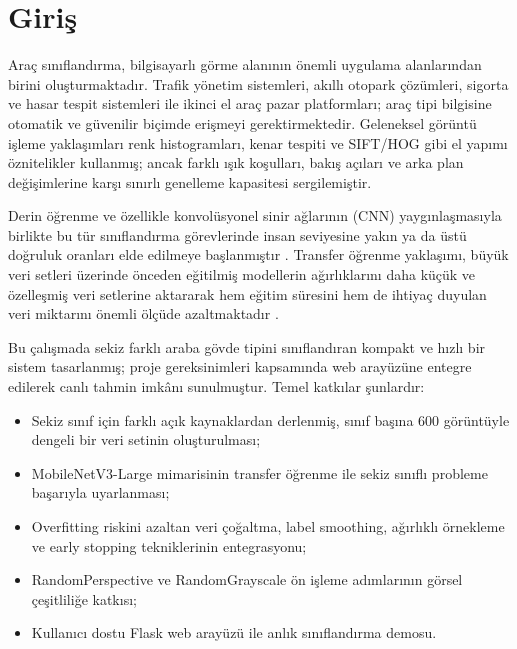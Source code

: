 \documentclass[conference]{IEEEtran}
\begin{document}
\section{Giriş}

Araç sınıflandırma, bilgisayarlı görme alanının önemli uygulama
alanlarından birini oluşturmaktadır. Trafik yönetim sistemleri, akıllı
otopark çözümleri, sigorta ve hasar tespit sistemleri ile ikinci el araç
pazar platformları; araç tipi bilgisine otomatik ve güvenilir biçimde
erişmeyi gerektirmektedir. Geleneksel görüntü işleme yaklaşımları renk
histogramları, kenar tespiti ve SIFT/HOG gibi el yapımı öznitelikler
kullanmış; ancak farklı ışık koşulları, bakış açıları ve arka plan
değişimlerine karşı sınırlı genelleme kapasitesi sergilemiştir.

Derin öğrenme ve özellikle konvolüsyonel sinir ağlarının (CNN) yaygınlaşmasıyla
birlikte bu tür sınıflandırma görevlerinde insan seviyesine yakın ya da
üstü doğruluk oranları elde edilmeye başlanmıştır \cite{resnet}.
Transfer öğrenme yaklaşımı, büyük veri setleri üzerinde önceden
eğitilmiş modellerin ağırlıklarını daha küçük ve özelleşmiş veri setlerine
aktararak hem eğitim süresini hem de ihtiyaç duyulan veri miktarını
önemli ölçüde azaltmaktadır \cite{mobilenetv3}.

Bu çalışmada sekiz farklı araba gövde tipini sınıflandıran kompakt ve hızlı
bir sistem tasarlanmış; proje gereksinimleri kapsamında web arayüzüne
entegre edilerek canlı tahmin imkânı sunulmuştur.
Temel katkılar şunlardır:

\begin{itemize}[leftmargin=*, itemsep=1pt, topsep=2pt]
  \item Sekiz sınıf için farklı açık kaynaklardan derlenmiş, sınıf başına
        600 görüntüyle dengeli bir veri setinin oluşturulması;
  \item MobileNetV3-Large mimarisinin transfer öğrenme ile sekiz sınıflı
        probleme başarıyla uyarlanması;
  \item Overfitting riskini azaltan veri çoğaltma, label smoothing,
        ağırlıklı örnekleme ve early stopping tekniklerinin entegrasyonu;
  \item RandomPerspective ve RandomGrayscale ön işleme adımlarının
        görsel çeşitliliğe katkısı;
  \item Kullanıcı dostu Flask web arayüzü ile anlık sınıflandırma demosu.
\end{itemize}
\end{document}
